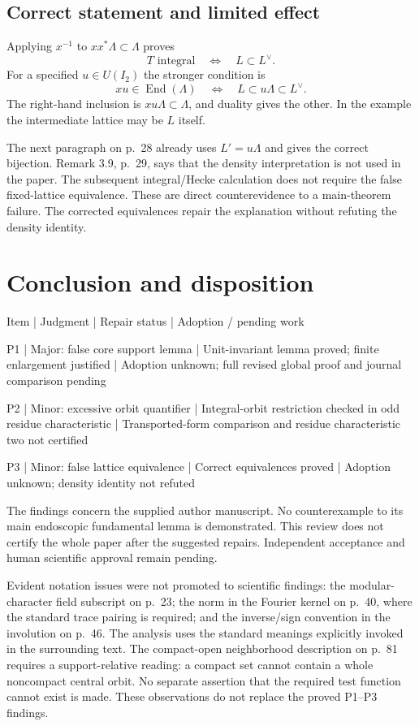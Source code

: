 \documentclass[10pt]{article}
\begin{document}
\subsection*{Correct statement and limited effect}
Applying \(x^{-1}\) to \(xx^*\Lambda\subset\Lambda\) proves \[T\text{ integral}\quad\Longleftrightarrow\quad L\subset L^\vee.\] For a specified \(u\in U(I_2)\) the stronger condition is \[xu\in\operatorname{End}(\Lambda)
 \quad\Longleftrightarrow\quad L\subset u\Lambda\subset L^\vee.\] The right-hand inclusion is \(xu\Lambda\subset\Lambda\), and duality gives the other. In the example the intermediate lattice may be \(L\) itself.\par
The next paragraph on p. 28 already uses \(L'=u\Lambda\) and gives the correct bijection. Remark 3.9, p. 29, says that the density interpretation is not used in the paper. The subsequent integral/Hecke calculation does not require the false fixed-lattice equivalence. These are direct counterevidence to a main-theorem failure. The corrected equivalences repair the explanation without refuting the density identity.\par
\section*{Conclusion and disposition}
Item | Judgment | Repair status | Adoption / pending work\par
P1 | Major: false core support lemma | Unit-invariant lemma proved; finite enlargement justified | Adoption unknown; full revised global proof and journal comparison pending\par
P2 | Minor: excessive orbit quantifier | Integral-orbit restriction checked in odd residue characteristic | Transported-form comparison and residue characteristic two not certified\par
P3 | Minor: false lattice equivalence | Correct equivalences proved | Adoption unknown; density identity not refuted\par
The findings concern the supplied author manuscript. No counterexample to its main endoscopic fundamental lemma is demonstrated. This review does not certify the whole paper after the suggested repairs. Independent acceptance and human scientific approval remain pending.\par
Evident notation issues were not promoted to scientific findings: the modular-character field subscript on p. 23; the norm in the Fourier kernel on p. 40, where the standard trace pairing is required; and the inverse/sign convention in the involution on p. 46. The analysis uses the standard meanings explicitly invoked in the surrounding text. The compact-open neighborhood description on p. 81 requires a support-relative reading: a compact set cannot contain a whole noncompact central orbit. No separate assertion that the required test function cannot exist is made. These observations do not replace the proved P1–P3 findings.\par
\end{document}
